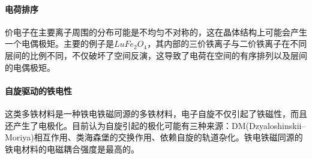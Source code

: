 \paragraph{电荷排序} 
价电子在主要离子周围的分布可能是不均匀不对称的，这在晶体结构上可能会产生一个电偶极矩。主要的例子是$LuFe_{2}O_{4}$，其内部的三价铁离子与二价铁离子在不同层间的比例不同，不仅破坏了空间反演，这导致了电荷在空间的有序排列以及层间的电偶极矩。\cite{qin2015an}

\paragraph{自旋驱动的铁电性}
这类多铁材料是一种铁电铁磁同源的多铁材料，电子自旋不仅引起了铁磁性，而且还产生了电极化。目前认为自旋引起的极化可能有三种来源：DM(Dzyaloshinskii–Moriya)相互作用\cite{dzyaloshinsky1958thermodynamic}、类海森堡的交换作用、依赖自旋的轨道杂化。铁电铁磁同源的铁电材料的电磁耦合强度是最高的。
